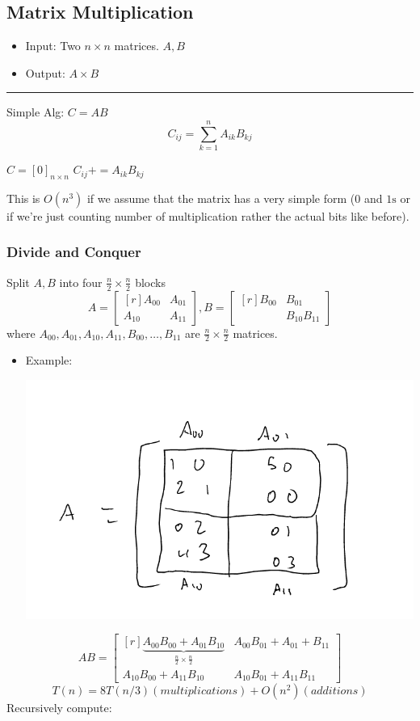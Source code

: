 \documentclass[11pt]{article}
\begin{document}
\subsection{Matrix Multiplication}
\label{sec:org7715378}
\begin{itemize}
\item Input: Two \(n\times n\) matrices. \(A,B\)
\item Output: \(A \times B\)
\end{itemize}

\noindent\rule{\textwidth}{0.5pt}
Simple Alg: \(C=AB\)
$$C_{ij}=\sum_{k=1}^{n}A_{ik}B_{kj}$$
\begin{algorithmic}
\State $C=[0]_{n\times n}$
			\State $C_{ij}+=A_{ik}B_{kj}$
		\EndFor
	\EndFor
\EndFor
\end{algorithmic}
This is \(O(n^3)\) if we assume that the matrix has a very simple form (\(0\) and \(1\text{s}\) or if we're just counting number of multiplication rather the actual bits like before).
\subsubsection{Divide and Conquer}
\label{sec:org376e050}
Split \(A,B\) into four \(\frac{n}{2}\times \frac{n}{2}\) blocks
$$ A = \begin{bmatrix*}[r] A_{00} & A_{01} \\ A_{10} & A_{11} \end{bmatrix*}, B = \begin{bmatrix*}[r] B_{00} & B_{01} \\ & B_{10} B_11 \end{bmatrix*}$$
where \(A_{00},A_{01}, A_{10}, A_{11}, B_{00}, \ldots, B_{11}\) are \(\frac{n}{2} \times \frac{n}{2}\) matrices.
\begin{itemize}
\item Example: \begin{center}
\includegraphics[width=.9\linewidth]{./Images/i80.png}
\end{center}
\end{itemize}
$$AB = \begin{bmatrix*}[r] \underbrace{A_{00}B_{00}+A_{01}B_{10}}_{\frac{n}{2}\times \frac{n}{2}} & A_{00}B_{01}+A_{01}+B_{11}
\\ A_{10}B_{00}+A_{11}B_{10} & A_{10}B_{01}+A_{11}B_{11}
\end{bmatrix*}$$
$$T(n)=8T(n/3) (multiplications)+O(n^2) (additions)$$
Recursively compute:
\end{document}
